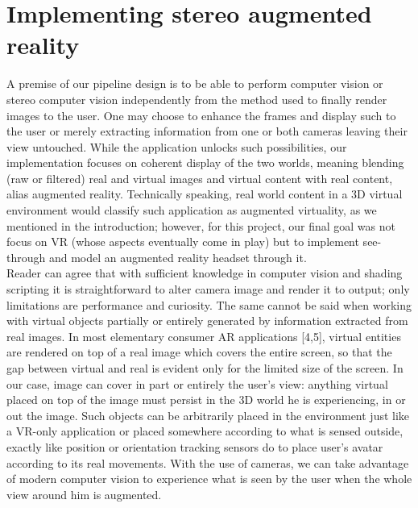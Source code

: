 \section{Implementing stereo augmented reality}
A premise of our pipeline design is to be able to perform computer vision or stereo computer vision independently from the method used to finally render images to the user. One may choose to enhance the frames and display such to the user or merely extracting information from one or both cameras leaving their view untouched. While the application unlocks such possibilities, our implementation focuses on coherent display of the two worlds, meaning blending (raw or filtered) real and virtual images and virtual content with real content, alias augmented reality. Technically speaking, real world content in a 3D virtual environment would classify such application as augmented virtuality, as we mentioned in the introduction; however, for this project, our final goal was not focus on VR (whose aspects eventually come in play) but to implement see-through and model an augmented reality headset through it.\\
Reader can agree that with sufficient knowledge in computer vision and shading scripting it is straightforward to alter camera image and render it to output; only limitations are performance and curiosity. The same cannot be said when working with virtual objects partially or entirely generated by information extracted from real images. In most elementary consumer AR applications [4,5], virtual entities are rendered on top of a real image which covers the entire screen, so that the gap between virtual and real is evident only for the limited size of the screen. In our case, image can cover in part or entirely the user's view: anything virtual placed on top of the image must persist in the 3D world he is experiencing, in or out the image. Such objects can be arbitrarily placed in the environment just like a VR-only application or placed somewhere according to what is sensed outside, exactly like position or orientation tracking sensors do to place user's avatar according to its real movements. With the use of cameras, we can take advantage of modern computer vision to experience what is seen by the user when the whole view around him is augmented.\\

